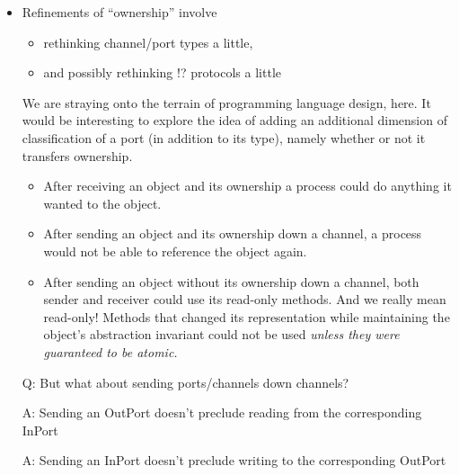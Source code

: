 \documentclass{concdistfoils}
\begin{document}
\begin{slide}
\begin{itemize}
\item Refinements of ``ownership'' involve 
\begin{itemize}
\item rethinking channel/port types a little,
\item and possibly rethinking !? protocols a little
\end{itemize}
\begin{note}
We are straying onto the terrain of programming language design,
here.  It would be interesting to explore the idea of adding an
additional dimension of classification of a port (in addition to
its type), namely whether or not it transfers ownership.

\begin{itemize}
\item After receiving an object and its ownership a process could
do anything it wanted to the object. 

\item After sending an object and its ownership down a channel,
a process would not be able to reference the object again.

\item After sending an object without its ownership down a channel, both sender
and receiver could use its read-only methods. And we really mean read-only!
Methods that changed its representation while maintaining the object's 
abstraction invariant could not be used 
\textit{unless they were guaranteed to be atomic.}
\end{itemize}
\end{note}
\vfill
\item[Q:] But what about sending ports/channels down channels?
\item[A:] Sending an OutPort doesn't preclude reading from the corresponding InPort
\item[A:] Sending an InPort doesn't preclude writing to the corresponding OutPort
\end{itemize}
\end{slide}


\end{document}
